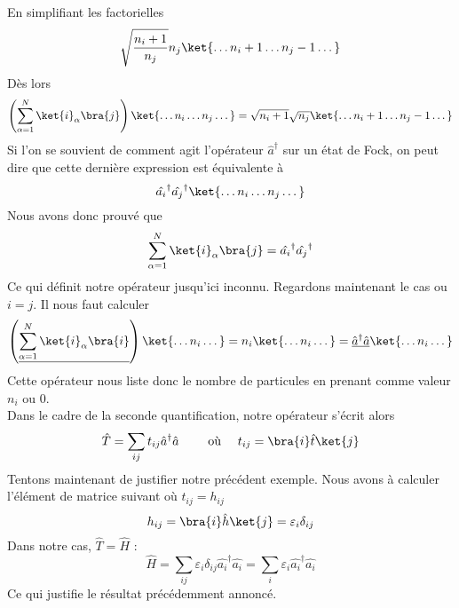 En simplifiant les factorielles
\begin{equation}
\sqrt{\dfrac{n_i+1}{n_j}}n_j\ket{\dots n_i+1\dots n_j-1\dots}
\end{equation}
Dès lors
\begin{equation}
\left( \sum_{\alpha=1}^N \ket{i}_\alpha\bra{j}\right)\ket{\dots n_i\dots n_j\dots}
 = \sqrt{n_i+1}\sqrt{n_j}\ket{\dots n_i+1\dots n_j-1\dots}
\end{equation}
Si l'on se souvient de comment agit l'opérateur $\hat{a}^\dagger$ sur un état de Fock, on peut dire 
que cette dernière expression est équivalente à
\begin{equation}
\hat{a_i}^\dagger\hat{a_j}^\dagger\ket{\dots n_i\dots n_j\dots}
\end{equation}
Nous avons donc prouvé que
\begin{equation}
\sum_{\alpha=1}^N \ket{i}_\alpha\bra{j} = \hat{a_i}^\dagger\hat{a_j}^\dagger
\end{equation}
Ce qui définit notre opérateur jusqu'ici inconnu. Regardons maintenant le cas ou $i=j$. 
Il nous faut calculer
\begin{equation}
\left(\underline{\sum_{\alpha=1}^N \ket{i}_\alpha\bra{i}}\right)\ket{\dots n_i\dots} = n_i\ket{\dots 
n_i\dots} = \underline{\hat{a}^\dagger\hat{a}}\ket{\dots n_i\dots}
\end{equation}
Cette opérateur nous liste donc le nombre de particules en prenant comme valeur $n_i$ ou 0.\\

Dans le cadre de la seconde quantification, notre opérateur s'écrit alors
\begin{equation}
\hat{T} = \sum_{ij} t_{ij}\hat{a}^\dagger\hat{a}\qquad\text{ où }\quad t_{ij} = \bra{i}\hat{t}\ket{j}
\end{equation}
Tentons maintenant de justifier notre précédent exemple. Nous avons à calculer l'élément de matrice 
suivant où $t_{ij} = h_{ij}$
\begin{equation}
h_{ij} = \bra{i}\hat{h}\ket{j} = \varepsilon_i\delta_{ij}
\end{equation}
Dans notre cas, $\hat{T}=\hat{H}$ :
\begin{equation}
\hat{H} = \sum_{ij} \varepsilon_i\delta_{ij} \hat{a_i}^\dagger\hat{a_i} = \sum_i \varepsilon_i\hat{a_i}^\dagger
\hat{a_i}
\end{equation}
Ce qui justifie le résultat précédemment annoncé.\\
\\

